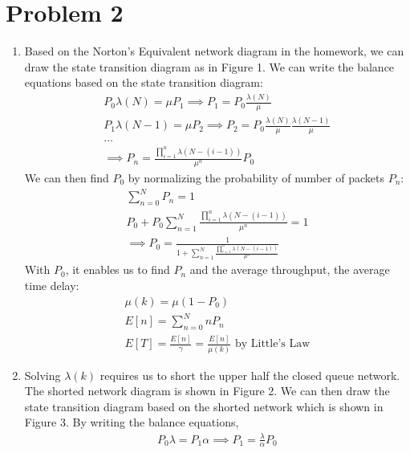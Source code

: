 \documentclass{article}
\begin{document}
\section*{Problem 2}
	\begin{enumerate}
		\item Based on the Norton's Equivalent network diagram in the homework, we
			can draw the state transition diagram as in Figure 1.
			\vspace{40mm}
			We can write the balance equations based on the state transition diagram:
			\begin{gather*}
				P_{0} \lambda(N) = \mu P_{1} \implies P_{1} = P_{0} \frac{\lambda(N)}{\mu} \\
				P_{1} \lambda(N-1) = \mu P_{2} \implies P_{2} = P_{0} \frac{\lambda(N)}{\mu} \frac{\lambda(N-1)}{\mu} \\
				\ldots \\
				\implies P_{n} = \frac{\prod\limits_{i=1}^{n} \lambda(N-(i-1))}{\mu^{n}} P_{0}
			\end{gather*}
			We can then find $P_{0}$ by normalizing the probability of number of
			packets $P_{n}$:
			\begin{gather*}
				\sum\limits_{n=0}^{N} P_{n} = 1 \\
				P_{0} + P_{0} \sum\limits_{n=1}^{N} \frac{\prod\limits_{i=1}^{n} \lambda(N-(i-1))}{\mu^{n}} = 1 \\
				\implies P_{0} = \frac{1}{1 + \sum\limits_{n=1}^{N} \frac{\prod\limits_{i=1}^{n} \lambda(N-(i-1))}{\mu^{n}}}
			\end{gather*}
			With $P_{0}$, it enables us to find $P_{n}$ and the average throughput,
			the average time delay:
			\begin{gather*}
				\mu(k) = \mu(1 - P_{0}) \\
				E[n] = \sum\limits_{n=0}^{N} nP_{n} \\
				E[T] = \frac{E[n]}{\gamma} = \frac{E[n]}{\mu(k)} \text{ by Little's Law}
			\end{gather*}
		\item Solving $\lambda(k)$ requires us to short the upper half the closed
			queue network. The shorted network diagram is shown in Figure 2.
			\vspace{40mm}
			We can then draw the state transition diagram based on the shorted
			network which is shown in Figure 3.
			\vspace{40mm}
			By writing the balance equations,
			\begin{gather*}
				P_{0} \lambda = P_{1} \alpha \implies P_{1} = \frac{\lambda}{\alpha} P_{0} \\

\end{gather*}
\end{enumerate}
\end{document}

